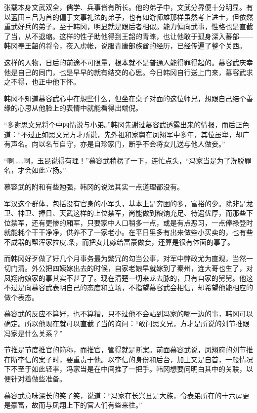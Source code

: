 张载本身文武双全，儒学、兵事皆有所长。他的弟子中，文武分界便十分明显。有以蓝田三吕为首的偏于文事礼法的弟子，也有如游师雄那样虽然考上进士，但依然重武好兵的弟子。至于韩冈，明显就是跟后者相似。能力偏向武事，性格也是直截了当，从不退缩。这样的性子助他得到王韶的青睐，也让他敢于孤身深入蕃部——韩冈奉王韶的将令，夜入虏帐，说服青唐部族酋的经历，已经传遍了整个关西。

这样的人物，日后的前途不可限量，根本就不是普通人能得罪得起的。慕容武庆幸他是自己的同门，也是早早的就有结交的心思。今日韩冈自行送上门来，慕容武求之不得，也正中他下怀。

韩冈不知道慕容武心中在想些什么，但坐在桌子对面的这位师兄，想跟自己结个善缘的心思从他脸上的表情中就能看得出端倪。

“多谢思文兄将个中内情说与小弟。”韩冈先谢过慕容武透露出来的情报，而后正色道：“不过正如思文兄方才所说，先外祖和家舅在凤翔军中多年，其位虽卑，却广有声名。向以名节自守，亦是自珍家门，断乎不会将女儿送与他人做妾。”

“啊……啊，玉昆说得有理！”慕容武稍楞了一下，连忙点头，“冯家当是为了洗脱罪名，才会如此宣扬。”

慕容武的附和有些勉强，韩冈的说法其实一点道理都没有。

军汉这个群体，包括没有官身的小军头，基本上是穷困的多，富裕的少。除非是龙卫、神卫、捧日、天武这样的上位禁军，尚能做到粮饷充足、待遇优厚，而那些下位禁军，还有更惨的厢军，只要家中人口稍多一点，或是有点恶习，一点俸禄登时就能耗个干干净净，供养不了一家老小。在平日里多有出来做些小买卖的，也有些不成器的帮浑家拉皮.条，而把女儿嫁给富豪做妾，还算是很有体面的事了。

而韩冈好歹做了好几个月事务最为繁冗的勾当公事，对军中弊政尤为直观，当然一切门清。外公把四姨嫁出去的时候，自家老娘早就嫁到了秦州，连大哥也生了，对凤翔府娘家的事其实不甚了了。现在清楚一切来龙去脉的，只有自家的舅舅。他这不过是向慕容武表明自己的态度和立场，不指望慕容武会相信，却希望他能相应的做个表态。

慕容武的反应不算好，也不算糟，只不过他不会站到冯家的哪一边的事，韩冈可以确定。所以他现在就可以直截了当的询问：“敢问思文兄，方才是所说的刘节推跟冯家是什么关系？”

节推是节度推官的简称，而推官，管得就是断案。前面慕容武说，凤翔府的刘节推在断李信的案子时，要重责于他。以李信的身份和后台，加上又是自首，一般情况下不至于如此轻率，冯家当是在中间推了一把手。韩冈想要问明白其中的关联，以便针对着做些准备。

慕容武意味深长的笑了笑，说道：“冯家在长兴县是大族，令表弟所在的十六房更是豪富，故而与凤翔上下的官人们有些来往。”

